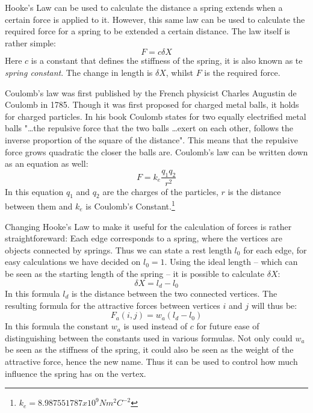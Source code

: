 \documentclass[a4paper,12pt]{article}
\begin{document}
    Hooke's Law can be used to calculate the distance a spring extends when a certain force is applied to it.
    However, this same law can be used to calculate the required force for a spring to be extended a certain distance.
    The law itself is rather simple:
    \begin{equation}
      F = c \delta X
    \end{equation}
    Here $c$ is a constant that defines the stiffness of the spring, it is also known as te \emph{spring constant}.
    The change in length is $\delta X$, whilst $F$ is the required force.

    Coulomb's law was first published by the French physicist Charles Augustin de Coulomb in 1785.\cite{coulomb1785premier}
    Though it was first proposed for charged metal balls, it holds for charged particles.
    In his book Coulomb states for two equally electrified metal balls "\ldots the repulsive force that the two balls \ldots exert on each other, follows the inverse proportion of the square of the distance".
    This means that the repulsive force grows quadratic the closer the balls are.
    Coulomb's law can be written down as an equation as well:
    \begin{equation}
      F = k_e \frac{q_1 q_2}{r^2}
    \end{equation}
     In this equation $q_1$ and $q_2$ are the charges of the particles, $r$ is the distance between them and $k_e$ is Coulomb's Constant.\footnote{$k_e = 8.987551787 x 10^9 N m^2 C^{-2}$}

    Changing Hooke's Law to make it useful for the calculation of forces is rather straightforeward:
    Each edge corresponds to a spring, where the vertices are objects connected by springs.
    Thus we can state a rest length $l_0$ for each edge, for easy calculations we have decided on $l_0 = 1$.
    Using the ideal length -- which can be seen as the starting length of the spring -- it is possible to calculate $\delta X$:
    \begin{equation}
      \delta X =  l_d - l_0
    \end{equation}
    In this formula $l_d$ is the distance between the two connected vertices.
    The resulting formula for the attractive forces between vertices $i$ and $j$ will thus be:
    \begin{equation}
      F_a (i,j) = w_{a} (l_d - l_0)
    \end{equation}
    In this formula the constant $w_{a}$ is used instead of $c$ for future ease of distinguishing between the constants used in various formulas.
    Not only could $w_{a}$ be seen as the stiffness of the spring, it could also be seen as the weight of the attractive force, hence the new name.
    Thus it can be used to control how much influence the spring has on the vertex.
\end{document}
